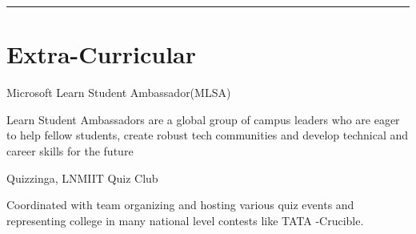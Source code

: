\documentclass[]{deedy-resume-openfont}
\begin{document}
      \par\noindent\rule{\textwidth}{0.4pt}
\section{Extra-Curricular}


{  {Microsoft Learn Student Ambassador(MLSA)}}
\hfill {}
\begin{tightemize}
\item Learn Student Ambassadors are a global group of campus leaders who are eager to help fellow students, create robust tech communities and develop technical and career skills for the future

\end{tightemize}

{  {Quizzinga, LNMIIT Quiz Club}}
\hfill {}
\begin{tightemize}
\item Coordinated with team organizing and hosting various quiz events and representing college in many national level contests like TATA -Crucible.

\end{tightemize}

      
\end{document}
